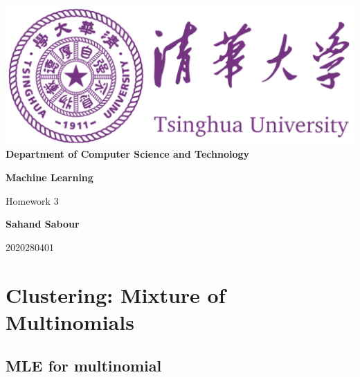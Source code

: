 \documentclass[12pt,a4paper]{article}
\begin{document}
	\begin{titlepage}
		\begin{center}
			\includegraphics[scale=.4]{Figures/Cover}\\
			\vspace{1cm}
			\bf{ \large {Department of Computer Science and Technology} }
		\end{center}
		
		\vspace{4cm}
		\centering
		\textbf{\Huge Machine Learning}
		\vspace{.5cm}
		
		{\Large Homework 3}

		\vspace{4cm}
		
		\textbf{\LARGE Sahand Sabour}
		
		
		
		\vspace{0.5cm}
		
		{\large 2020280401}
		
		
		\vfill
		
	\end{titlepage}


	\section{Clustering: Mixture of Multinomials}
	\subsection{MLE for multinomial}
	
\end{document}
